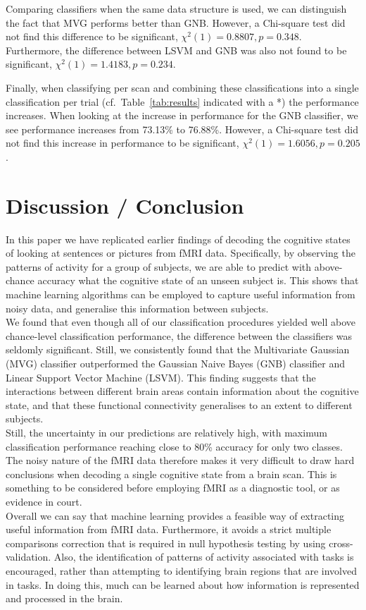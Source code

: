 \documentclass[preprint,journal,11pt]{vgtc}
\begin{document}
Comparing classifiers when the same data structure is used, we can distinguish the fact that MVG performs better than GNB. However, a Chi-square test did not find this difference to be significant, $\chi^2(1) = 0.8807, p = 0.348$. Furthermore, the difference between LSVM and GNB was also not found to be significant, $\chi^2(1) = 1.4183, p = 0.234$.

Finally, when classifying per scan and combining these classifications into a single classification per trial (cf.~Table~\ref{tab:results} indicated with a *) the performance increases. When looking at the increase in performance for the GNB classifier, we see performance increases from 73.13\% to 76.88\%. However, a Chi-square test did not find this increase in performance to be significant, $\chi^2(1) = 1.6056, p = 0.205$.

\section{Discussion / Conclusion}
\label{sec:discussion}

In this paper we have replicated earlier findings of decoding the cognitive states of looking at sentences or pictures from fMRI data. Specifically, by observing the patterns of activity for a group of subjects, we are able to predict with above-chance accuracy what the cognitive state of an unseen subject is. This shows that machine learning algorithms can be employed to capture useful information from noisy data, and generalise this information between subjects.\\
\indent We found that even though all of our classification procedures yielded well above chance-level classification performance, the difference between the classifiers was seldomly significant. Still, we consistently found that the Multivariate Gaussian (MVG) classifier outperformed the Gaussian Naive Bayes (GNB) classifier and Linear Support Vector Machine (LSVM). This finding suggests that the interactions between different brain areas contain information about the cognitive state, and that these functional connectivity generalises to an extent to different subjects.\\
\indent Still, the uncertainty in our predictions are relatively high, with maximum classification performance reaching close to 80\% accuracy for only two classes. The noisy nature of the fMRI data therefore makes it very difficult to draw hard conclusions when decoding a single cognitive state from a brain scan. This is something to be considered before employing fMRI as a diagnostic tool, or as evidence in court.\\
\indent Overall we can say that machine learning provides a feasible way of extracting useful information from fMRI data. Furthermore, it avoids a strict multiple comparisons correction that is required in null hypothesis testing by using cross-validation. Also, the identification of patterns of activity associated with tasks is encouraged, rather than attempting to identifying brain regions that are involved in tasks. In doing this, much can be learned about how information is represented and processed in the brain.




\end{document}
